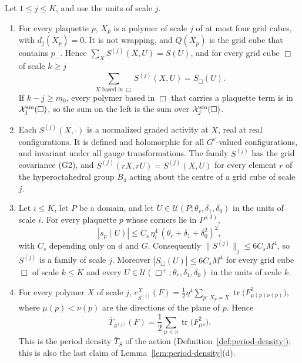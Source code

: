 \begin{lemma}\label{lem:plaquette-family}
Let $1\le j\le K$, and use the units of scale $j$.
\begin{enumerate}[label=(\alph*)]
\item For every plaquette $p$, $X_p$ is a polymer of scale $j$ of at most four grid cubes, with $d_j(X_p)=0$. It is not wrapping, and $Q(X_p)$ is the grid cube that contains $p_-$. Hence $\sum_XS^{(j)}(X,U)=S(U)$, and for every grid cube $\Box$ of scale $k\ge j$
\[
\sum_{X\text{ based in }\Box}S^{(j)}(X,U)=S_\Box(U).
\]
If $k-j\ge m_0$, every polymer based in $\Box$ that carries a plaquette term is in $\mathcal X^{\rm sm}_j(\Box)$, so the sum on the left is the sum over $\mathcal X^{\rm sm}_j(\Box)$.
\item Each $S^{(j)}(X,\cdot)$ is a normalized graded activity at $X$, real at real configurations. It is defined and holomorphic for all $G^c$-valued configurations, and invariant under all gauge transformations. The family $S^{(j)}$ has the grid covariance (G2), and $S^{(j)}(rX,rU)=S^{(j)}(X,U)$ for every element $r$ of the hyperoctahedral group $B_4$ acting about the centre of a grid cube of scale $j$.
\item Let $i\le K$, let $P$ be a domain, and let $U\in\mathcal U(P;\theta_r,\delta_1,\delta_0)$ in the units of scale $i$. For every plaquette $p$ whose corners lie in $P^{(3)}$,
\[
|s_p(U)|\le C_s\,\eta_i^4\,(\theta_r+\delta_1+\delta_0^2)^2,
\]
with $C_s$ depending only on $d$ and $G$. Consequently $\|S^{(j)}\|_j\le6C_sM^4$, so $S^{(j)}$ is a family of scale $j$. Moreover $|S_\Box(U)|\le6C_sM^4$ for every grid cube $\Box$ of scale $k\le K$ and every $U\in\mathcal U(\Box^+;\theta_r,\delta_1,\delta_0)$ in the units of scale $k$.
\item For every polymer $X$ of scale $j$, $c^X_{S^{(j)}}(F)=\frac12\eta^4\sum_{p:\,X_p=X}\operatorname{tr}\big(F_{\mu(p)\nu(p)}^2\big)$, where $\mu(p)<\nu(p)$ are the directions of the plane of $p$. Hence
\[
\bar T_{S^{(j)}}(F)=\frac12\sum_{\mu<\nu}\operatorname{tr}\big(F_{\mu\nu}^2\big).
\]
This is the period density $\bar T_S$ of the action (Definition~\ref{def:period-density}); this is also the last claim of Lemma~\ref{lem:period-density}(d).
\end{enumerate}
\end{lemma}

